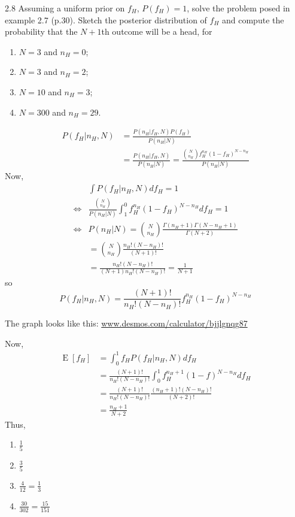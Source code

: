 \documentclass[12pt, a4paper]{article}
\begin{document}
\begin{prob}{2.8}
Assuming a uniform prior on $f_H$, $P(f_H) = 1$, solve the problem
posed in example 2.7 (p.30). Sketch the posterior distribution of $f_H$ and
compute the probability that the $N + 1$th outcome will be a head, for
\begin{enumerate}
\item[(a)] $N = 3$ and $n_H = 0$;
\item[(b)] $N = 3$ and $n_H = 2$;
\item[(c)] $N = 10$ and $n_H = 3$;
\item[(d)] $N = 300$ and $n_H = 29$.
\end{enumerate}

\end{prob}
\begin{sol}
\begin{align*}
    P(f_H | n_H, N) &= \frac{P(n_H | f_H, N) P(f_H)}{P(n_H | N)} \\
    &= \frac{P(n_H | f_H, N)}{P(n_H | N)} = \frac{\binom{N}{n_H} f_H^{n_H} (1-f_H)^{N-n_H}}{P(n_H | N)}
\end{align*}
Now,
\begin{align*}
    & \int P(f_H | n_H, N) df_H = 1 \\
    \iff & \frac{\binom{N}{n_H}}{P(n_H | N)} \int_{1}^{0} f_H^{n_H} (1-f_H)^{N-n_H} df_H = 1 \\
    \iff & P(n_H | N) = \binom{N}{n_H} \frac{\Gamma(n_H + 1) \Gamma(N-n_H+1)}{\Gamma(N+2)}\\
    & = \binom{N}{n_H} \frac{n_H! (N-n_H)!}{(N+1)!}\\
    & = \frac{n_H!(N-n_H)!}{(N+1)n_H!(N-n_H)!} = \frac{1}{N+1}
\end{align*}
so
$$P(f_H | n_H, N) = \frac{(N+1)!}{n_H!(N-n_H)!} f_H^{n_H} (1-f_H)^{N-n_H}$$

\vspace{1em}
The graph looks like this: \href{https://www.desmos.com/calculator/bjjlgnqg87}{www.desmos.com/calculator/bjjlgnqg87}

Now,
\begin{align*}
    \operatorname{E}[f_H] &= \int_{0}^{1} f_H P(f_H | n_H, N) df_H \\
    &= \frac{(N+1)!}{n_H!(N-n_H)!} \int_{0}^{1} f_H^{n_H+1}(1-f)^{N-n_H} df_H \\
    &= \frac{(N+1)!}{n_H!(N-n_H)!} \frac{(n_H+1)!(N-n_H)!}{(N+2)!} \\
    &= \frac{n_H+1}{N+2}
\end{align*}
Thus,
\begin{enumerate}
    \item[(a)] $\frac{1}{5}$
    \item[(b)] $\frac{3}{5}$
    \item[(c)] $\frac{4}{12} = \frac{1}{3}$
    \item[(d)] $\frac{30}{302} = \frac{15}{151}$
\end{enumerate}
\end{sol}
\bigskip
\end{document}
